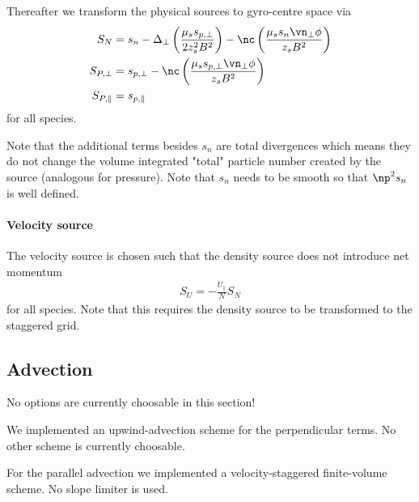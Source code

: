Thereafter we transform the physical sources to gyro-centre space via
\begin{align}
   S_N &= s_n - \Delta_\perp \left( \frac{\mu_s s_{p,\perp}}{2z_s^2B^2}\right) - \nc\left( \frac{\mu_s s_n \vn_\perp \phi}{z_sB^2}\right) \\
   S_{P,\perp} &= s_{p,\perp} - \nc\left( \frac{\mu_s s_{p,\perp}\vn_\perp \phi}{z_sB^2}\right) \\
   S_{P,\parallel} &= s_{p,\parallel}
\end{align}
for all species.

Note that the additional terms besides $s_{n}$ are total divergences which
means they do not change the volume integrated "total" particle number created
by the source (analogous for pressure).  Note that $s_{n}$ needs to be smooth so that $\np^2 s_{n}$
is well defined.

\paragraph{Velocity source}
The velocity source is chosen such that the density source does not introduce
net momentum
\begin{align}
    S_U = -\frac{U_\parallel}{N} S_N
    \label{eq:velocity_source}
\end{align}
for all species. Note that this requires the density source to be transformed to the staggered grid.

\subsection{Advection}
No options are currently choosable in this section!

We implemented an upwind-advection scheme for the perpendicular terms.
No other scheme is currently choosable.

For the parallel advection we implemented a velocity-staggered finite-volume
scheme. No slope limiter is used.
